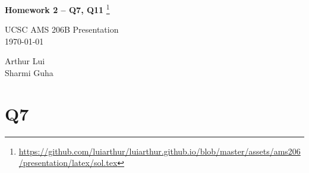 \documentclass[12pt]{article}
\def\wl{\par \vspace{\baselineskip}\noindent}
\def\hline{ \textcolor{lgrey}{\hrulefill} }
\begin{document}
\begin{center}
  {\huge \textbf{Homework 2 -- Q7, Q11}
    \footnote{\url{https://github.com/luiarthur/luiarthur.github.io/blob/master/assets/ams206/presentation/latex/sol.tex}}
  }\\
  \wl
  UCSC AMS 206B Presentation\\
  \noindent\today\\
  \wl
  Arthur Lui\\
  Sharmi Guha\\
  \hline
\end{center}

\section*{Q7}

\end{document}
